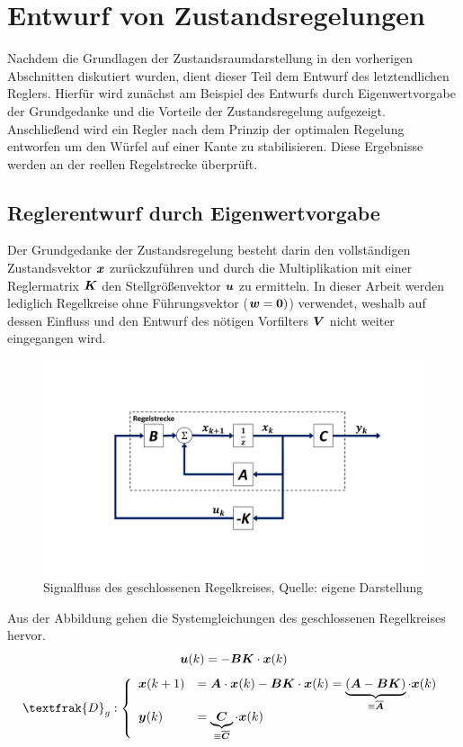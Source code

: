 \section{Entwurf von Zustandsregelungen}
Nachdem die Grundlagen der Zustandsraumdarstellung in den vorherigen Abschnitten diskutiert wurden, dient dieser Teil dem Entwurf des letztendlichen Reglers. Hierfür wird zunächst am Beispiel des Entwurfs durch Eigenwertvorgabe der Grundgedanke und die Vorteile der Zustandsregelung aufgezeigt. Anschließend wird ein Regler nach dem Prinzip der optimalen Regelung entworfen um den Würfel auf einer Kante zu stabilisieren. Diese Ergebnisse werden an der reellen Regelstrecke überprüft.

\subsection{Reglerentwurf durch Eigenwertvorgabe}
Der Grundgedanke der Zustandsregelung besteht darin den vollständigen Zustandsvektor $\boldsymbol{x}$ zurückzuführen und durch die Multiplikation mit einer Reglermatrix $\boldsymbol{K}$ den Stellgrößenvektor $\boldsymbol{u}$ zu ermitteln. In dieser Arbeit werden lediglich Regelkreise ohne Führungsvektor ($\boldsymbol{w}=\boldsymbol{0})$) verwendet, weshalb auf dessen Einfluss und den Entwurf des nötigen Vorfilters $\boldsymbol{V}$ nicht weiter eingegangen wird.
\begin{figure}[H]
\centering
\includegraphics[width=0.8\linewidth, trim={3.5cm 3.5cm 3.5cm 3.5cm}, clip]{img/RT_ClosedLoop}
\caption{Signalfluss des geschlossenen Regelkreises, Quelle: eigene Darstellung}
\end{figure}
Aus der Abbildung gehen die Systemgleichungen des geschlossenen Regelkreises  hervor.
\begin{equation}
\boldsymbol{u}(k) = -\boldsymbol{B}\boldsymbol{K}\cdot\boldsymbol{x}(k)
\end{equation}
\begin{equation}
\textfrak{D}_g
: \left\{ \begin{array}{ll}
\bs{{x}}(k+1) &= \bs{A}\cdot \bs{x}(k) - \bs{B}\bs{K}\cdot \bs{x}(k) = \underbrace{(\bs{A}-\bs{B}\bs{K})}_{\equiv \bs{\overline{A}}}\cdot \bs{x}(k) \\
\bs{y}(k) &= \underbrace{\bs{C}}_{\equiv \bs{\overline{C}}}\cdot \bs{x}(k)
\end{array}
\right.
\end{equation}
